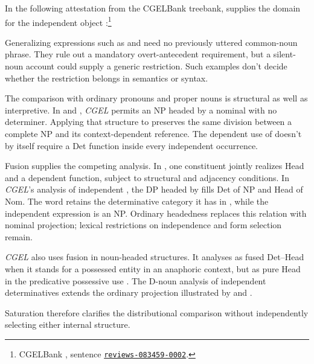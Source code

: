 \documentclass[12pt]{article}
\begin{document}
In the following attestation from the CGELBank treebank,  supplies the domain for the independent object :\footnote{CGELBank \citep{reynolds2023unified}, sentence \href{https://github.com/nert-nlp/cgel/blob/d0a2c2d8c522b23d5aa879fc9cb94948f4285b2c/datasets/ewt.cgel\#L651-L654}{\nolinkurl{reviews-083459-0002}}.}
\ea\label{ex:attested-both}
\z

Generalizing expressions such as  and  need no previously uttered common-noun phrase. They rule out a mandatory overt-antecedent requirement, but a silent-noun account could supply a generic restriction. Such examples don't decide whether the restriction belongs in semantics or syntax.

The comparison with ordinary pronouns and proper nouns is structural as well as interpretive. In  and , \textit{CGEL} permits an NP headed by a nominal with no determiner. Applying that structure to  preserves the same division between a complete NP and its context-dependent reference. The dependent use of  doesn't by itself require a Det function inside every independent occurrence.

Fusion supplies the competing analysis. In \textcite{Payne2007}, one constituent jointly realizes Head and a dependent function, subject to structural and adjacency conditions. In \textit{CGEL}'s analysis of independent , the DP headed by  fills Det of NP and Head of Nom. The word retains the determinative category it has in , while the independent expression is an NP. Ordinary headedness replaces this relation with nominal projection; lexical restrictions on independence and form selection remain.

\textit{CGEL} also uses fusion in noun-headed structures. It analyses  as fused Det--Head when it stands for a possessed entity in an anaphoric context, but as pure Head in the predicative possessive use  \citep[410--411]{huddleston2002}. The D-noun analysis of independent determinatives extends the ordinary projection illustrated by  and .

Saturation therefore clarifies the distributional comparison without independently selecting either internal structure.
\end{document}
